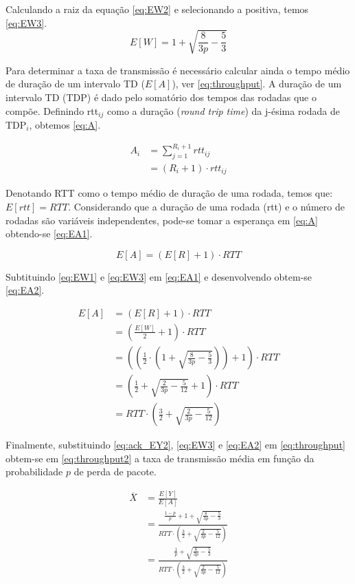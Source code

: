 Calculando a raiz da equação \eqref{eq:EW2} e selecionando a positiva, temos \eqref{eq:EW3}.
\begin{equation} \label{eq:EW3}
E[W] = 1 + \sqrt{\frac{8}{3p} - \frac{5}{3}}
\end{equation}

Para determinar a taxa de transmissão é necessário calcular ainda o tempo médio de duração de um intervalo 
TD ($E[A]$), ver \eqref{eq:throughput}. A duração de um intervalo TD (TDP) é dado pelo somatório dos tempos
das rodadas que o compõe. Definindo rtt$_{ij}$ como a duração (\textit{round trip time}) da j-ésima rodada
de TDP$_i$, obtemos \eqref{eq:A}.

\begin{align} \label{eq:A}
\nonumber A_i &= \sum_{j=1}^{R_i + 1} rtt_{ij} \\
&=(R_i + 1) \cdot  rtt_{ij}
\end{align}

Denotando RTT como o tempo médio de duração de uma rodada, temos que: $E[rtt]=RTT$. Considerando que a duração
de uma rodada (rtt) e o número de rodadas são variáveis independentes, pode-se tomar a esperança em \eqref{eq:A}
obtendo-se \eqref{eq:EA1}.

\begin{equation} \label{eq:EA1}
E[A] = (E[R] + 1) \cdot  RTT
\end{equation}

Subtituindo \eqref{eq:EW1} e \eqref{eq:EW3} em \eqref{eq:EA1} e desenvolvendo obtem-se \eqref{eq:EA2}.

\begin{align} \label{eq:EA2}
\nonumber E[A] &= (E[R] + 1) \cdot  RTT \\
\nonumber &= \left(\frac{E[W]}{2} + 1\right) \cdot  RTT \\
\nonumber &= \left(\left(\frac{1}{2} \cdot  \left(1 + \sqrt{\frac{8}{3p} - \frac{5}{3}}\right)\right) + 1\right) \cdot  RTT \\
\nonumber &= \left(\frac{1}{2} + \sqrt{\frac{2}{3p} - \frac{5}{12}} + 1\right) \cdot  RTT \\
&= RTT \cdot  \left(\frac{3}{2} + \sqrt{\frac{2}{3p} - \frac{5}{12}} \right)
\end{align}

Finalmente, substituindo \eqref{eq:ack_EY2}, \eqref{eq:EW3} e \eqref{eq:EA2} em \eqref{eq:throughput} obtem-se em
\eqref{eq:throughput2} a taxa de transmissão média em função da probabilidade $p$ de perda de pacote.

\begin{align} \label{eq:throughput2}
\nonumber \overline{X} &= \frac{E[Y]}{E[A]} \\
\nonumber &=\frac{\frac{1 - p}{p} + 1 + \sqrt{\frac{8}{3p} - \frac{5}{3}}}{RTT \cdot  \left(\frac{3}{2} + \sqrt{\frac{2}{3p} - \frac{5}{12}} \right)} \\
&=\frac{\frac{1}{p} + \sqrt{\frac{8}{3p} - \frac{5}{3}}}{RTT \cdot  \left(\frac{3}{2} + \sqrt{\frac{2}{3p} - \frac{5}{12}} \right)}
\end{align}
